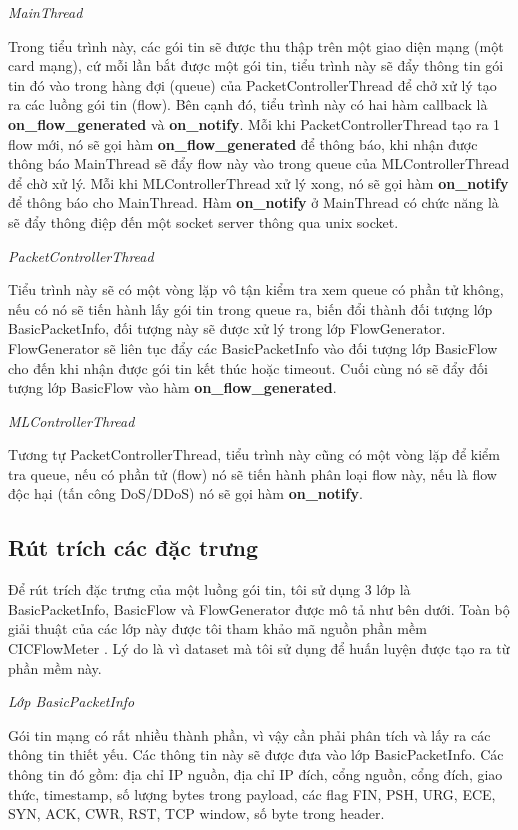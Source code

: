 \textit{MainThread}

Trong tiểu trình này, các gói tin sẽ được thu thập trên một giao diện mạng (một card mạng), cứ mỗi lần bắt được một gói tin, tiểu trình này sẽ đẩy thông tin gói tin đó vào trong hàng đợi (queue) của PacketControllerThread để chở xử lý tạo ra các luồng gói tin (flow). Bên cạnh đó, tiểu trình này có hai hàm callback là \textbf{on\_flow\_generated} và \textbf{on\_notify}. Mỗi khi PacketControllerThread tạo ra 1 flow mới, nó sẽ gọi hàm \textbf{on\_flow\_generated} để thông báo, khi nhận được thông báo MainThread sẽ đẩy flow này vào trong queue của MLControllerThread để chờ xử lý. Mỗi khi MLControllerThread xử lý xong, nó sẽ gọi hàm \textbf{on\_notify} để thông báo cho MainThread. Hàm \textbf{on\_notify} ở MainThread có chức năng là sẽ đẩy thông điệp đến một socket server thông qua unix socket.

\textit{PacketControllerThread}

Tiểu trình này sẽ có một vòng lặp vô tận kiểm tra xem queue có phần tử không, nếu có nó sẽ tiến hành lấy gói tin trong queue ra, biến đổi thành đối tượng lớp BasicPacketInfo, đối tượng này sẽ được xử lý trong lớp FlowGenerator. FlowGenerator sẽ liên tục đẩy các BasicPacketInfo vào đối tượng lớp BasicFlow cho đến khi nhận được gói tin kết thúc hoặc timeout. Cuối cùng nó sẽ đẩy đối tượng lớp BasicFlow vào hàm \textbf{on\_flow\_generated}.

\textit{MLControllerThread}

Tương tự PacketControllerThread, tiểu trình này cũng có một vòng lặp để kiểm tra queue, nếu có phần tử (flow) nó sẽ tiến hành phân loại flow này, nếu là flow độc hại (tấn công DoS/DDoS) nó sẽ gọi hàm \textbf{on\_notify}.

\subsection{Rút trích các đặc trưng}

Để rút trích đặc trưng của một luồng gói tin, tôi sử dụng 3 lớp là BasicPacketInfo, BasicFlow và FlowGenerator được mô tả như bên dưới. Toàn bộ giải thuật của các lớp này được tôi tham khảo mã nguồn phần mềm CICFlowMeter \cite{37-cicflowmeter}. Lý do là vì dataset mà tôi sử dụng để huấn luyện được tạo ra từ phần mềm này.

\textit{Lớp BasicPacketInfo}

Gói tin mạng có rất nhiều thành phần, vì vậy cần phải phân tích và lấy ra các thông tin thiết yếu. Các thông tin này sẽ được đưa vào lớp BasicPacketInfo. Các thông tin đó gồm: địa chỉ IP nguồn, địa chỉ IP đích, cổng nguồn, cổng đích, giao thức, timestamp, số lượng bytes trong payload, các flag FIN, PSH, URG, ECE, SYN, ACK, CWR, RST, TCP window, số byte trong header.

